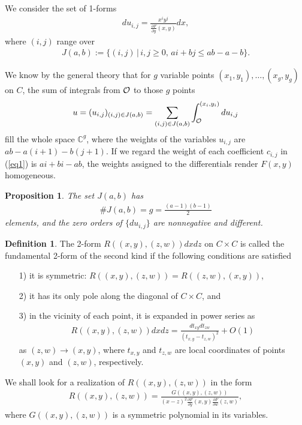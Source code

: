 \documentclass[pdftex]{sigma}
\numberwithin{equation}{section}
\newtheorem{prop}[teiri]{Proposition}
\theoremstyle{definition}
\newtheorem{teigi}[teiri]{Definition}
\begin{document}
We consider the set of 1-forms \cite{nakayashiki}
\begin{gather*}du_{i,j}=\frac{x^iy^j}{ \frac{\partial F}{\partial y}(x,y)}dx,\end{gather*}
where $(i,j)$ range over
\begin{gather*}J(a,b):=\{(i,j)\,|\,i,j\geq 0,\, ai+bj\leq ab-a-b\}.\end{gather*}

We know by the general theory that for $g$ variable points $(x_1,y_1), \dots,(x_g,y_g)$ on $C$, the sum of integrals from $\cal O$ to those $g$ points
\begin{gather*}u=(u_{i,j})_{(i,j)\in J(a,b)}=\sum_{(i,j)\in J(a,b)}\int_{\cal O}^{(x_i,y_i)}du_{i,j}\end{gather*}
f\/ill the whole space ${\mathbb C}^g$, where the weights of the variables $u_{i,j}$ are $ab-a(i+1)-b(j+1)$. If we regard the weight of each coef\/f\/icient $c_{i,j}$ in (\ref{eq1}) is $ai+bi-ab$, the weights assigned to the dif\/ferentials render $F(x,y)$ homogeneous.

\begin{prop}\label{proposition1}
The set $J(a,b)$ has
\begin{gather*}\#J(a,b)=g=\frac{(a-1)(b-1)}{2}\end{gather*}
elements, and the zero orders of $\{du_{i,j}\}$ are nonnegative and different.
\end{prop}

\begin{teigi}
The 2-form $R((x,y),(z,w))dxdz$ on $C\times C$ is called the fundamental 2-form of the second kind if the following conditions are satisf\/ied
\begin{enumerate}\itemsep=0pt
\item[1)] it is symmetric: $R((x,y),(z,w))=R((z,w),(x,y))$,
\item[2)] it has its only pole along the diagonal of $C\times C$, and
\item[3)] in the vicinity of each point, it is expanded in power series as
\begin{gather*}R((x,y),(z,w))dxdz=\frac{dt_{xy}dt_{zw}}{(t_{x,y}-t_{z,w})^2}+O(1)\end{gather*}
as $(z,w)\rightarrow (x,y)$, where $t_{x,y}$ and $t_{z,w}$ are local coordinates of points $(x,y)$ and $(z,w)$, respectively.
\end{enumerate}
\end{teigi}

We shall look for a realization of $R((x,y),(z,w))$ in the form
\begin{gather*}R((x,y),(z,w))=\frac{G((x,y),(z,w))}{(x-z)^2\frac{\partial F}{\partial y}(x,y)\frac{\partial F}{\partial w}(z,w)},\end{gather*}
where $G((x,y),(z,w))$ is a symmetric polynomial in its variables.
\end{document}
